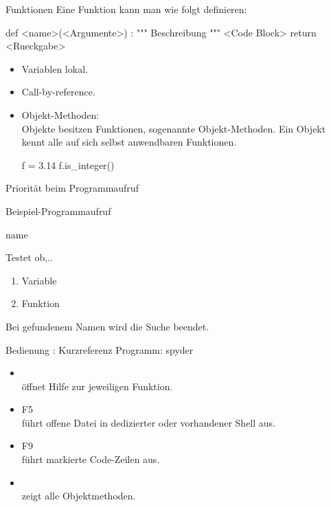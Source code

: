 \documentclass[hyperref={xetex}]{beamer}
\begin{document}
\begin{frame}[fragile]{Funktionen}
Eine Funktion kann man wie folgt definieren:
\begin{pyin}
def <name>(<Argumente>) : 
    """ Beschreibung """
    <Code Block>
    return <Rueckgabe>
\end{pyin}
\begin{itemize}
\item Variablen lokal.
\item Call-by-reference.
\item \alert{Objekt-Methoden}:\\
Objekte besitzen Funktionen, sogenannte Objekt-Methoden.
Ein Objekt kennt alle auf sich selbst anwendbaren Funktionen.

\begin{pyin}
f = 3.14
f.is_integer()
\end{pyin}
\end{itemize}

\end{frame}


\begin{frame}[fragile]{Priorität beim Programmaufruf}

Beispiel-Programmaufruf
\begin{pyin}
name
\end{pyin}

Testet ob,..
\begin{enumerate}
\item  \alert{Variable}
\item  \alert{Funktion} 
\end{enumerate}
Bei gefundenem Namen wird die Suche beendet.
\end{frame}


\begin{frame}{Bedienung : Kurzreferenz}
  Programm:  spyder 
\begin{itemize}
\item \alert{ }\\ öffnet Hilfe zur jeweiligen Funktion.
\item \alert{F5}\\ führt offene Datei in dedizierter oder vorhandener Shell aus.
\item \alert{F9}\\ führt markierte Code-Zeilen aus.
\item \alert{} \\ zeigt alle Objektmethoden.
\end{itemize}
\end{frame}
\end{document}

